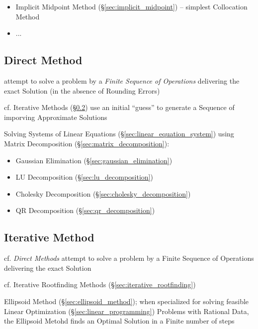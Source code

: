 \begin{itemize}
  \item Implicit Midpoint Method (\S\ref{sec:implicit_midpoint}) -- simplest
    Collocation Method
  \item ...
\end{itemize}



\subsection{Direct Method}\label{sec:direct_method}

attempt to solve a problem by a \emph{Finite Sequence of Operations} delivering
the exact Solution (in the absence of Rounding Errors)

cf. Iterative Methods (\S\ref{sec:iterative_method}) use an initial ``guess'' to
generate a Sequence of imporving Approximate Solutions

Solving Systems of Linear Equations (\S\ref{sec:linear_equation_system})
using Matrix Decomposition (\S\ref{sec:matrix_decomposition}):
\begin{itemize}
  \item Gaussian Elimination (\S\ref{sec:gaussian_elimination})
  \item LU Decomposition (\S\ref{sec:lu_decomposition})
  \item Cholesky Decomposition (\S\ref{sec:cholesky_decomposition})
  \item QR Decomposition (\S\ref{sec:qr_decomposition})
\end{itemize}



\subsection{Iterative Method}\label{sec:iterative_method}

cf. \emph{Direct Methods} attempt to solve a problem by a Finite Sequence of
Operations delivering the exact Solution

\fist cf. Iterative Rootfinding Methods (\S\ref{sec:iterative_rootfinding})

\fist Ellipsoid Method (\S\ref{sec:ellipsoid_method}); when specialized for
solving feasible Linear Optimization (\S\ref{sec:linear_programming}) Problems
with Rational Data, the Ellipsoid Metohd finds an Optimal Solution in a Finite
number of steps

